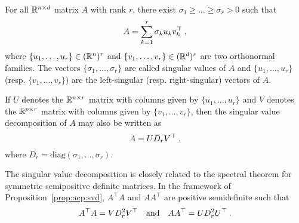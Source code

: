 \begin{shaded}
\begin{proposition} 
\label{prop:acp:svd}
For all $\mathbb{R}^{n \times d}$ matrix $A$ with rank $r$, there exist $\sigma_1\geqslant \ldots \geqslant \sigma_r>0$ such that
\[
A = \sum_{k=1}^r \sigma_k u_k v^\top_k\;,
\]
where $\{u_1,\ldots,u_r\}\in (\mathbb{R}^n)^r$ and $\{v_1,\ldots,v_r\}\in (\mathbb{R}^d)^r$ are two orthonormal families. The vectors $\{\sigma_1,\ldots,\sigma_r\}$ are called singular values of $A$ and $\{u_1,\ldots,u_r\}$ (resp. $\{v_1,\ldots,v_r\}$) are the left-singular (resp. right-singular) vectors of $A$.
\end{proposition}
\end{shaded}
\begin{remark}
If $U$ denotes the $\mathbb{R}^{n\times r}$ matrix with columns given by $\{u_1,\ldots,u_r\}$ and $V$ denotes the $\mathbb{R}^{p \times r}$ matrix with columns given by $\{v_1,\ldots,v_r\}$, then the singular value decomposition of $A$ may also be written as
\[
A = UD_rV^\top\;,
\]
where $D_r = \mathrm{diag}(\sigma_1,\ldots,\sigma_r)$.
\end{remark}
\begin{remark}
The singular value decomposition is closely related to the spectral theorem for symmetric semipositive definite matrices. In the framework of Proposition~\ref{prop:acp:svd}, $A^\top A$ and $AA^\top$ are positive semidefinite such that
\[
A^\top A = VD_r^2V^\top\quad\mathrm{and}\quad AA^\top = UD_r^2U^\top\;.
\]
\end{remark}
